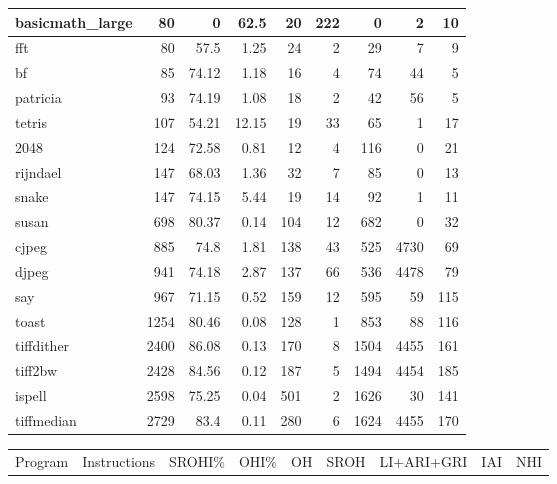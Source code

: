 \begin{tabular}{l|r|r|r|r|r|r|r|r}
\hline
 basicmath\_large &       80 &     0    &  62.5  &   20 &  222 &      0 &     2 &    10 \\
\hline
 fft             &       80 &    57.5  &   1.25 &   24 &    2 &     29 &     7 &     9 \\
\hline
 bf              &       85 &    74.12 &   1.18 &   16 &    4 &     74 &    44 &     5 \\
\hline
 patricia        &       93 &    74.19 &   1.08 &   18 &    2 &     42 &    56 &     5 \\
\hline
 tetris          &      107 &    54.21 &  12.15 &   19 &   33 &     65 &     1 &    17 \\
\hline
 2048            &      124 &    72.58 &   0.81 &   12 &    4 &    116 &     0 &    21 \\
\hline
 rijndael        &      147 &    68.03 &   1.36 &   32 &    7 &     85 &     0 &    13 \\
\hline
 snake           &      147 &    74.15 &   5.44 &   19 &   14 &     92 &     1 &    11 \\
\hline
 susan           &      698 &    80.37 &   0.14 &  104 &   12 &    682 &     0 &    32 \\
\hline
 cjpeg           &      885 &    74.8  &   1.81 &  138 &   43 &    525 &  4730 &    69 \\
\hline
 djpeg           &      941 &    74.18 &   2.87 &  137 &   66 &    536 &  4478 &    79 \\
\hline
 say             &      967 &    71.15 &   0.52 &  159 &   12 &    595 &    59 &   115 \\
\hline
 toast           &     1254 &    80.46 &   0.08 &  128 &    1 &    853 &    88 &   116 \\
\hline
 tiffdither      &     2400 &    86.08 &   0.13 &  170 &    8 &   1504 &  4455 &   161 \\
\hline
 tiff2bw         &     2428 &    84.56 &   0.12 &  187 &    5 &   1494 &  4454 &   185 \\
\hline
 ispell          &     2598 &    75.25 &   0.04 &  501 &    2 &   1626 &    30 &   141 \\
\hline
 tiffmedian      &     2729 &    83.4  &   0.11 &  280 &    6 &   1624 &  4455 &   170 \\
\hline
\end{tabular}\begin{tabular}{l|r|r|r|r|r|r|r|r}
\hline
 Program         &   Instructions &   SROHI\% &   OHI\% &   OH &   SROH &   LI+ARI+GRI &   IAI &   NHI \\

\end{tabular}
